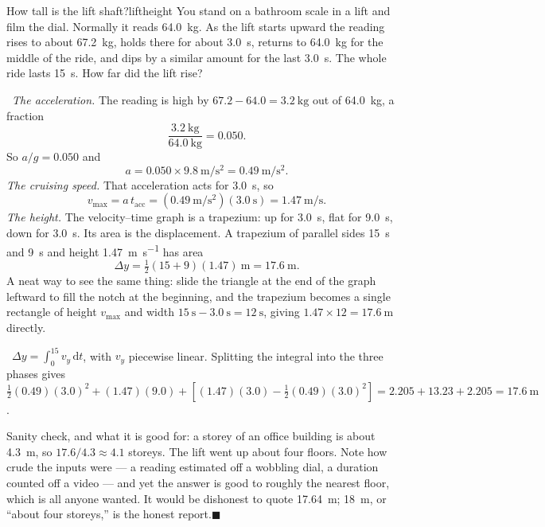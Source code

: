 \documentclass[11pt,twoside,openany]{book}
\newcommand{\dd}{\mathrm{d}}
\newcounter{check}[chapter]
\newcommand{\viewtag}[3]{\fcolorbox{#2}{#3}{\footnotesize\textbf{\textcolor{#2}{#1}}}}
\newcommand{\elemtag}{\viewtag{Elementary}{elemcol}{elempale}}
\newcommand{\calctag}{\viewtag{Calculus}{calccol}{calcpale}}
\newcommand{\elem}{\par\medskip\noindent\elemtag\ }
\newcommand{\calc}{\par\medskip\noindent\calctag\ }
\newcommand{\qed}{\hfill$\blacksquare$}
\begin{document}
\begin{example}{How tall is the lift shaft?}{liftheight}
You stand on a bathroom scale in a lift and film the dial. Normally it reads \SI{64.0}{\kilo\gram}. As the lift starts upward the reading rises to about \SI{67.2}{\kilo\gram}, holds there for about \SI{3.0}{\second}, returns to \SI{64.0}{\kilo\gram} for the middle of the ride, and dips by a similar amount for the last \SI{3.0}{\second}. The whole ride lasts \SI{15}{\second}. How far did the lift rise?

\elem \emph{The acceleration.} The reading is high by $67.2 - 64.0 = \SI{3.2}{\kilo\gram}$ out of \SI{64.0}{\kilo\gram}, a fraction
\[
\frac{\SI{3.2}{\kilo\gram}}{\SI{64.0}{\kilo\gram}} = 0.050 .
\]
So $a/g = 0.050$ and
\[
a = 0.050 \times \SI{9.8}{\metre\per\second\squared} = \SI{0.49}{\metre\per\second\squared}.
\]
\emph{The cruising speed.} That acceleration acts for \SI{3.0}{\second}, so
\[
v_{\max} = a\,t_{\text{acc}} = (\SI{0.49}{\metre\per\second\squared})(\SI{3.0}{\second}) = \SI{1.47}{\metre\per\second}.
\]
\emph{The height.} The velocity--time graph is a trapezium: up for \SI{3.0}{\second}, flat for \SI{9.0}{\second}, down for \SI{3.0}{\second}. Its area is the displacement. A trapezium of parallel sides \SI{15}{\second} and \SI{9}{\second} and height \SI{1.47}{\metre\per\second} has area
\[
\Delta y = \tfrac12(15 + 9)(1.47)\ \si{\metre} = \SI{17.6}{\metre}.
\]
A neat way to see the same thing: slide the triangle at the end of the graph leftward to fill the notch at the beginning, and the trapezium becomes a single rectangle of height $v_{\max}$ and width $\SI{15}{\second} - \SI{3.0}{\second} = \SI{12}{\second}$, giving $1.47 \times 12 = \SI{17.6}{\metre}$ directly.

\calc $\Delta y = \int_0^{15} v_y\,\dd t$, with $v_y$ piecewise linear. Splitting the integral into the three phases gives $\tfrac12(0.49)(3.0)^2 + (1.47)(9.0) + \left[(1.47)(3.0) - \tfrac12(0.49)(3.0)^2\right] = 2.205 + 13.23 + 2.205 = \SI{17.6}{\metre}$.

Sanity check, and what it is good for: a storey of an office building is about \SI{4.3}{\metre}, so $17.6/4.3 \approx 4.1$ storeys. The lift went up about four floors. Note how crude the inputs were --- a reading estimated off a wobbling dial, a duration counted off a video --- and yet the answer is good to roughly the nearest floor, which is all anyone wanted. It would be dishonest to quote \SI{17.64}{\metre}; \SI{18}{\metre}, or ``about four storeys,'' is the honest report.\qed
\end{example}
\end{document}
